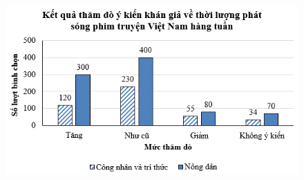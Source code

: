 \begin{bt}
\begin{loigiaichuong40}
		\begin{figure}[H]
			\centering
			\vspace*{-5pt}
			\captionsetup{labelformat= empty, justification=centering}
			\includegraphics[width=0.5\linewidth]{14}
			\vspace*{-10pt}
		\end{figure}
	\end{loigiaichuong40}
\end{bt}
